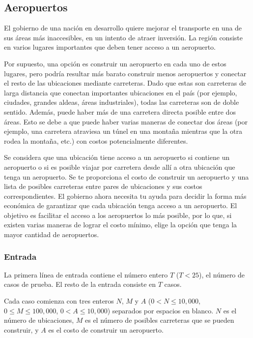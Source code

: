 \newpage
\subsection*{Aeropuertos}

El gobierno de una nación en desarrollo quiere mejorar el transporte en una de sus áreas
más inaccesibles, en un intento de atraer inversión. La región consiste en varios lugares
importantes que deben tener acceso a un aeropuerto.

Por supuesto, una opción es construir un aeropuerto en cada uno de estos lugares, pero
podría resultar más barato construir menos aeropuertos y conectar el resto de las
ubicaciones mediante carreteras. Dado que estas son carreteras de larga distancia que
conectan importantes ubicaciones en el país (por ejemplo, ciudades, grandes aldeas, áreas
industriales), todas las carreteras son de doble sentido. Además, puede haber más de una
carretera directa posible entre dos áreas. Esto se debe a que puede haber varias maneras
de conectar dos áreas (por ejemplo, una carretera atraviesa un túnel en una montaña
mientras que la otra rodea la montaña, etc.) con costos potencialmente diferentes.

Se considera que una ubicación tiene acceso a un aeropuerto si contiene un aeropuerto o si
es posible viajar por carretera desde allí a otra ubicación que tenga un aeropuerto. Se te
proporciona el costo de construir un aeropuerto y una lista de posibles carreteras entre
pares de ubicaciones y sus costos correspondientes. El gobierno ahora necesita tu ayuda
para decidir la forma más económica de garantizar que cada ubicación tenga acceso a un
aeropuerto. El objetivo es facilitar el acceso a los aeropuertos lo más posible, por lo
que, si existen varias maneras de lograr el costo mínimo, elige la opción que tenga la
mayor cantidad de aeropuertos.

\subsubsection*{Entrada}

La primera línea de entrada contiene el número entero \(T\) (\(T < 25\)), el número de
casos de prueba. El resto de la entrada consiste en \(T\) casos.

Cada caso comienza con tres enteros \(N\), \(M\) y \(A\) (\(0 < N \leq 10,000\), \(0 \leq
M \leq 100,000\), \(0 < A \leq 10,000\)) separados por espacios en blanco. \(N\) es el
número de ubicaciones, \(M\) es el número de posibles carreteras que se pueden construir,
y \(A\) es el costo de construir un aeropuerto.

